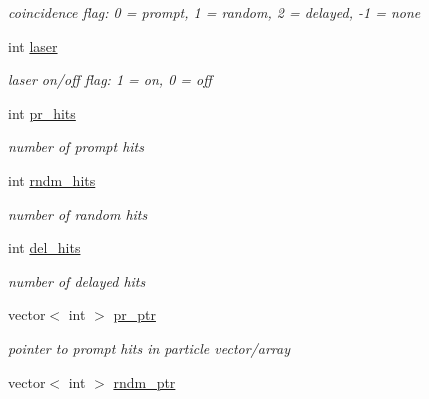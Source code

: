 \begin{DoxyCompactItemize}
\begin{DoxyCompactList}\small\item\em coincidence flag\-: 0 = prompt, 1 = random, 2 = delayed, -\/1 = none \end{DoxyCompactList}\item 
\hypertarget{classg__clx_a636dfc5c0302782a3a021dff3f6ec53e}{int \hyperlink{classg__clx_a636dfc5c0302782a3a021dff3f6ec53e}{laser}}\label{classg__clx_a636dfc5c0302782a3a021dff3f6ec53e}

\begin{DoxyCompactList}\small\item\em laser on/off flag\-: 1 = on, 0 = off \end{DoxyCompactList}\item 
\hypertarget{classg__clx_ab238ce0805d4af78ff43b999360a28f4}{int \hyperlink{classg__clx_ab238ce0805d4af78ff43b999360a28f4}{pr\-\_\-hits}}\label{classg__clx_ab238ce0805d4af78ff43b999360a28f4}

\begin{DoxyCompactList}\small\item\em number of prompt hits \end{DoxyCompactList}\item 
\hypertarget{classg__clx_a2ca61cc109e9e0580f35a4baa5ca4b21}{int \hyperlink{classg__clx_a2ca61cc109e9e0580f35a4baa5ca4b21}{rndm\-\_\-hits}}\label{classg__clx_a2ca61cc109e9e0580f35a4baa5ca4b21}

\begin{DoxyCompactList}\small\item\em number of random hits \end{DoxyCompactList}\item 
\hypertarget{classg__clx_a1205d577537a7131563e281be99f4a97}{int \hyperlink{classg__clx_a1205d577537a7131563e281be99f4a97}{del\-\_\-hits}}\label{classg__clx_a1205d577537a7131563e281be99f4a97}

\begin{DoxyCompactList}\small\item\em number of delayed hits \end{DoxyCompactList}\item 
\hypertarget{classg__clx_a33325f12a127d94cc10a8cc491df2f15}{vector$<$ int $>$ \hyperlink{classg__clx_a33325f12a127d94cc10a8cc491df2f15}{pr\-\_\-ptr}}\label{classg__clx_a33325f12a127d94cc10a8cc491df2f15}

\begin{DoxyCompactList}\small\item\em pointer to prompt hits in particle vector/array \end{DoxyCompactList}\item 
\hypertarget{classg__clx_a5dee420c080c876ed2c5467ec212d3f7}{vector$<$ int $>$ \hyperlink{classg__clx_a5dee420c080c876ed2c5467ec212d3f7}{rndm\-\_\-ptr}}\label{classg__clx_a5dee420c080c876ed2c5467ec212d3f7}


\end{DoxyCompactItemize}
